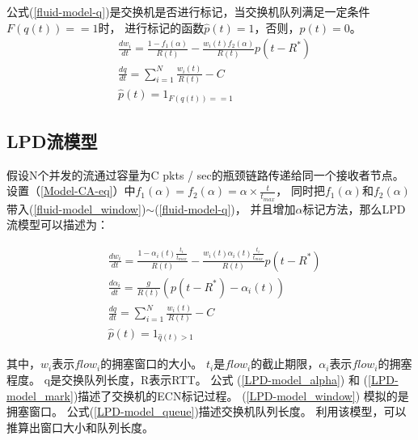 公式(\ref{fluid-model-q})是交换机是否进行标记，当交换机队列满足一定条件$F({q}(t))==1$时，
进行标记的函数$\widehat{p}(t)=1$，否则，$\widehat{p}(t)=0$。
 \begin{align}
&\frac{dw_i}{dt}=\frac{1-f_1(\alpha)}{R(t)}-\frac{w_i(t)f_2(\alpha)}{R(t)}p(t-R^*)  \label{fluid-model_window} \\
&\frac{dq}{dt}= \sum_{i=1}^N{\frac{w_i(t)}{R(t)}}-C \label{fluid-model_queue}  \\
&\widehat{p}(t)=1_{F({q}(t))==1}  \label{fluid-model-q}
\end{align}




\subsection{LPD流模型}
假设N个并发的流通过容量为C pkts / sec的瓶颈链路传递给同一个接收者节点。
设置（\ref{Model-CA-eq}）中$f_1(\alpha)=f_2(\alpha)=\alpha \times \frac{t}{t_{max}}$，
同时把$f_1(\alpha)$和$f_2(\alpha)$带入(\ref{fluid-model_window})$\sim$(\ref{fluid-model-q})，
并且增加$\alpha$标记方法，那么LPD流模型可以描述为：


 \begin{align}
&\frac{dw_i}{dt}=\frac{1-\alpha_i(t)\frac{t_i}{t_{max}}}{R(t)}-\frac{w_i(t)\alpha_i(t)\frac{t_i}{t_{max}}}{R(t)}p(t-R^*)  \label{LPD-model_window} \\
&\frac{d\alpha_i}{dt}=\frac{g}{R(t)}(p(t-R^*)-\alpha_i(t)) \label{LPD-model_alpha} \\
&\frac{dq}{dt}= \sum_{i=1}^N{\frac{w_i(t)}{R(t)}}-C \label{LPD-model_queue}  \\
&\widehat{p}(t)=1_{\widehat{q}(t)>1}  \label{LPD-model_mark}
\end{align}



其中，$w_i$表示$flow_i$的拥塞窗口的大小。 
$t_i$是$flow_i$的截止期限，$\alpha_i$表示$flow_i$的拥塞程度。 
q是交换队列长度，R表示RTT。
公式 (\ref{LPD-model_alpha}) 和 (\ref{LPD-model_mark})描述了交换机的ECN标记过程。
(\ref{LPD-model_window}) 模拟的是拥塞窗口。
公式(\ref{LPD-model_queue})描述交换机队列长度。
利用该模型，可以推算出窗口大小和队列长度。

